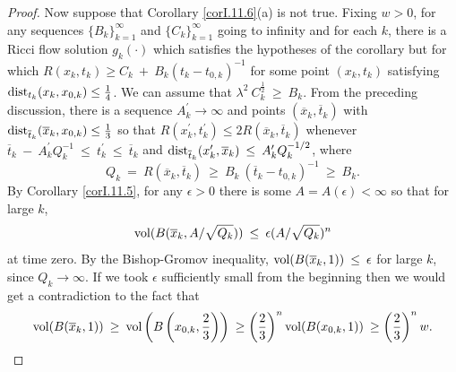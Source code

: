 \begin{proof}
Now suppose that Corollary \ref{corI.11.6}(a) is not true.
Fixing $w > 0$,
for any sequences $\{B_k\}_{k=1}^\infty$ and $\{C_k\}_{k=1}^\infty$
going to infinity and
for each $k$, there is a Ricci flow solution $g_k(\cdot)$
which satisfies the hypotheses of
the corollary but for which $R(x_k,t_k) \ge C_k \: + \: B_k (t_k - t_{0,k})^{-1}$
for some point $(x_k, t_k)$ satisfying $\operatorname{dist}_{t_k}(x_k, x_{0,k}) \le \frac14$.
We can assume that $\lambda^2 \: C_k^{\frac12} \: \ge \: B_k$.
From the preceding discussion, there is a sequence $A^\prime_k \rightarrow
\infty$ and points $(\overline{x}_k, \overline{t}_k)$
with $\operatorname{dist}_{\overline{t}_k}(\overline{x}_k, {x}_{0,k}) \le \frac13$ so that
$R(x_k^\prime, t_k^\prime) \le 2
R(\overline{x}_k, \overline{t}_k)$ whenever
$\overline{t}_k \: - \: A_k^\prime
Q_k^{-1} \: \le \: t_k^\prime \: \le \: \overline{t}_k$ and
$\operatorname{dist}_{\overline{t}_k}(x_k^\prime, \overline{x}_k) \: \le \: A_k^\prime
Q_k^{-1/2}$, where
\begin{equation}
Q_k \: = \: R(\overline{x}_k, \overline{t}_k) \: \ge \:
B_k \: (\overline{t}_k - t_{0,k})^{-1} \: \ge \: B_k.
\end{equation}
By Corollary \ref{corI.11.5}, for any $\epsilon > 0$ there is some
$A = A(\epsilon)< \infty$
so that for large $k$,
\begin{equation}
\operatorname{vol}(B(\overline{x}_k, A/\sqrt{Q_k})) \: \le \: \epsilon
(A/\sqrt{Q_k})^n
\end{equation}
at time zero. By the Bishop-Gromov inequality,
$\operatorname{vol}(B(\overline{x}_k, 1)) \: \le \: \epsilon$ for large $k$, since
$Q_k \rightarrow \infty$.
If we took $\epsilon$ sufficiently small from the beginning then we
would get a contradiction to the fact that
\begin{equation}
\operatorname{vol}(B(\overline{x}_k, 1)) \: \ge \: \operatorname{vol} \left( B \left( x_{0,k}, \frac23 \right) \right) \: \ge
\left( \frac23 \right)^n \operatorname{vol}(B(x_{0,k}, 1)) \: \ge \left( \frac23 \right)^n w.
\end{equation}



\end{proof}
